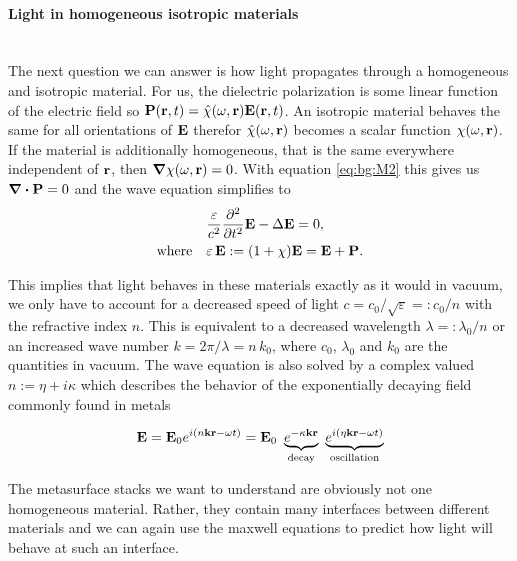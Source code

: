 \paragraph{Light in homogeneous isotropic materials}~\\
\label{par:light_in_materials}The next question we can answer is how light propagates through a homogeneous and isotropic material. For us, the dielectric polarization is some linear function of the electric field so $\vb P(\vb r, t) = \hat{\chi}(\omega, \vb r) \vb E(\vb r, t)$. An isotropic material behaves the same for all orientations of $\vb E$ therefor $\hat{\chi}(\omega, \vb r)$ becomes a scalar function $\chi(\omega, \vb r)$. If the material is additionally homogeneous, that is the same everywhere independent of $\vb r$, then $\grad \chi(\omega, \vb r) = 0$. With equation \eqref{eq:bg:M2} this gives us $\div \vb P = 0$
and the wave equation simplifies to
\begin{equation}
\begin{aligned}
    &\frac{\varepsilon}{c^2} \pdv[2] t \vb E - \Delta \vb E = 0,\\
    \qq*{where} &\varepsilon \, \vb E := \qty(1 + \chi) \vb E = \vb E + \vb P.
\end{aligned}
\end{equation}

This implies that light behaves in these materials exactly as it would in vacuum, we only have to account for a decreased speed of light
$c = {c_0} / {\sqrt{\varepsilon}} =: {c_0} / {n}$
with the refractive index $n$.
This is equivalent to a decreased wavelength
$\lambda =: {\lambda_0} / {n}$
or an increased wave number
$k = {2 \pi} / {\lambda} = n \, k_0$,
where $c_0$, $\lambda_0$ and $k_0$ are the quantities in vacuum.
The wave equation is also solved by a complex valued $n := \eta + i \kappa$ which describes the behavior of the exponentially decaying field commonly found in metals 

\begin{equation}
    \vb E = \vb E_0 e^{i(n \vb k \vb r - \omega t)}
    = \vb E_0 \
    \underbrace{e^{-\kappa \vb k \vb r}}_{\mathrm{
    decay}} \
    \underbrace{e^{i(\eta \vb k \vb r - \omega t)}}_{\mathrm{
    oscillation}}
\end{equation}

The metasurface stacks we want to understand are obviously not one homogeneous material. Rather, they contain many interfaces between different materials and we can again use the maxwell equations to predict how light will behave at such an interface.
\\

